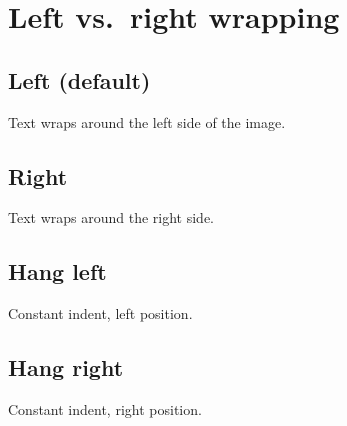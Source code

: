 \documentclass{article}
\begin{document}
\section*{Left vs.\ right wrapping}

\subsection*{Left (default)}
Text wraps around the left side of the image.

\lipsum[1-3]

\newpage

\subsection*{Right}
Text wraps around the right side.

\lipsum[4-6]

\newpage

\subsection*{Hang left}
Constant indent, left position.

\lipsum[7-9]

\newpage

\subsection*{Hang right}
Constant indent, right position.

\lipsum[10-12]
\end{document}
